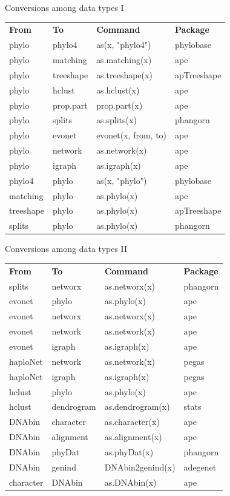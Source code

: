 \documentclass[compress, ucs, xelatex, 11pt, xcolor=svgnames,
  hyperref={
    bookmarks=true,
    unicode=true,
    colorlinks=true,
    pdftitle={Molecular data in R},
    plainpages=false,
    pdfauthor={Vojtech Zeisek},
    pdfsubject={Course about phylogeny and evolution in R},
    pdfcreator={XeLaTeX},
    pdfkeywords={R, evolution, phylogeny, molecular data},
    linkcolor=Tomato,
    anchorcolor=SaddleBrown,
    citecolor=Goldenrod,
    filecolor=DarkMagenta,
    menucolor=Sienna,
    urlcolor=DarkTurquoise,
    pdftex},
  url={hyphens, lowtilde} %
  ]{beamer}
\begin{document}
\begin{frame}{Conversions among data types I}
  \begin{tabular}{llll}
    \textbf{From} & \textbf{To} & \textbf{Command} & \textbf{Package}\\
    phylo & phylo4 & as(x, "phylo4") & phylobase\\
    phylo & matching & as.matching(x) & ape\\
    phylo & treeshape & as.treeshape(x) & apTreeshape\\
    phylo & hclust & as.hclust(x) & ape\\
    phylo & prop.part & prop.part(x) & ape\\
    phylo & splits & as.splits(x) & phangorn\\
    phylo & evonet & evonet(x, from, to) & ape\\
    phylo & network & as.network(x) & ape\\
    phylo & igraph & as.igraph(x) & ape\\
    phylo4 & phylo & as(x, "phylo") & phylobase\\
    matching & phylo & as.phylo(x) & ape\\
    treeshape & phylo & as.phylo(x) & apTreeshape\\
    splits & phylo & as.phylo(x) & phangorn
  \end{tabular}
\end{frame}

\begin{frame}{Conversions among data types II}
  \begin{tabular}{llll}
    \textbf{From} & \textbf{To} & \textbf{Command} & \textbf{Package}\\
    splits & networx & as.networx(x) & phangorn\\
    evonet & phylo & as.phylo(x) & ape\\
    evonet & networx & as.networx(x) & ape\\
    evonet & network & as.network(x) & ape\\
    evonet & igraph & as.igraph(x) & ape\\
    haploNet & network & as.network(x) & pegas\\
    haploNet & igraph & as.igraph(x) & pegas\\
    hclust & phylo & as.phylo(x) & ape\\
    hclust & dendrogram & as.dendrogram(x) & stats\\
    DNAbin & character & as.character(x) & ape\\
    DNAbin & alignment & as.alignment(x) & ape\\
    DNAbin & phyDat & as.phyDat(x) & phangorn\\
    DNAbin & genind & DNAbin2genind(x) & adegenet\\
    character & DNAbin & as.DNAbin(x) & ape
  \end{tabular}
\end{frame}
\end{document}
